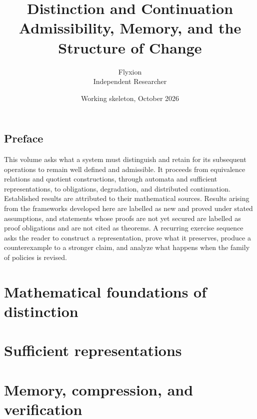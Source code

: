 \documentclass[11pt,twoside]{book}
\title{Distinction and Continuation\\[0.4em]\large Admissibility, Memory, and the Structure of Change}
\author{Flyxion\\Independent Researcher}
\date{Working skeleton, October 2026}
\begin{document}
\frontmatter
\maketitle
\tableofcontents



\chapter*{Preface}
This volume asks what a system must distinguish and retain for its subsequent operations to remain well defined and admissible. It proceeds from equivalence relations and quotient constructions, through automata and sufficient representations, to obligations, degradation, and distributed continuation. Established results are attributed to their mathematical sources. Results arising from the frameworks developed here are labelled as new and proved under stated assumptions, and statements whose proofs are not yet secured are labelled as proof obligations and are not cited as theorems. A recurring exercise sequence asks the reader to construct a representation, prove what it preserves, produce a counterexample to a stronger claim, and analyze what happens when the family of policies is revised.

\mainmatter

\part{Mathematical foundations of distinction}









\part{Sufficient representations}









\part{Memory, compression, and verification}
\end{document}
